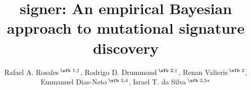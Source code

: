 \documentclass{bioinfo}
\begin{document}
\title[empirical Bayesian NMF]{signer: An empirical Bayesian approach
  to mutational signature discovery}
\author[Rosales, R. A. and Drummond, R. D.~\textit{et~al}.]{
    Rafael A. Rosales\,$^{\text{\sfb 1,}\dagger}$, 
    Rodrigo D. Drummond\,$^{\text{\sfb 2,}\dagger}$, 
    Renan Valieris\,$^{\text{\sfb 2}}$,
    Emmanuel Dias-Neto\,$^{\text{\sfb 3,4}}$, 
    Israel T. da Silva\,$^{\text{\sfb 2,5}*}$}
\address{%
   $^{\text{\sf 1}}$Departamento de Computa\c{c}\~ao e
   Matem\'atica, Universidade de S\~ao Paulo, SP 14040-901, Brazil, 
   $^{\text{\sf 2}}$Laboratory of Bioinformatics and Computational 
   Biology, A. C. Camargo Cancer Center, SP  01509-010, 
   Brazil, $^{\text{\sf 3}}$Laboratory of Medical Genomics,
   A. C. Camargo Cancer Center, SP 01509-010, Brazil, $^{\text{\sf  4}}$Laboratory of Neurosciences (LIM27),
   Department and Institute of Psychiatry, Faculty of Medicine, University of S\~ao Paulo, SP 05403-903, Brazil,
   $^{\text{\sf 5}}$Laboratory of Molecular Immunology, The
   Rockefeller University, NY 10065, USA\\[1em]
   {\normalsize $^{\dagger}$The authors wish it to be known
   that, in their opinion, the first two authors should be regarded
   as joint First Authors} 
}
\end{document}
